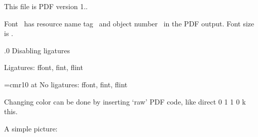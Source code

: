 This file is PDF version 1.\the\pdfminorversion.
\bigskip


Font \fontname\font\ has resource name tag
\pdffontname\font\ and object number \pdffontobjnum\font\ in the PDF output.
Font size is \pdffontsize\font.\par

.0 {Disabling ligatures}

Ligatures: ffont, fint, flint\par
{\font\noli=cmr10 at\pdffontsize\font
 \pdfnoligatures\noli No ligatures: ffont, fint, flint}
\bigskip

\endfeature


\pdfincludechars{}


Changing color can be done by inserting `raw' PDF code, like
\pdfliteral direct {0 1 1 0 k} %
this.


A simple picture:

%

